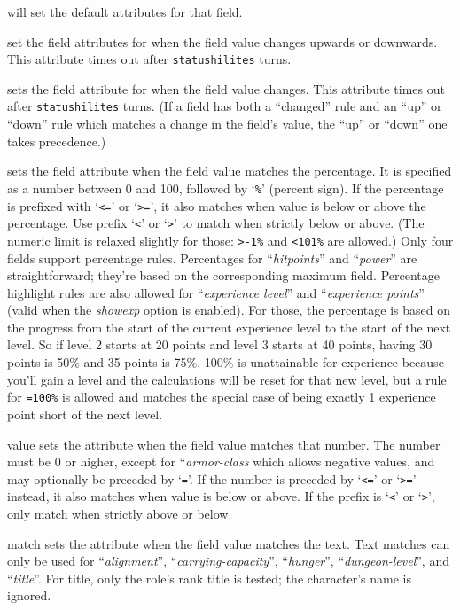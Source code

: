 \blist{}
\item[{\tt always}] will set the default attributes for that field.
\item[{\tt up}{\normalfont, }{\tt down}] set the field attributes
for when the field value changes upwards or downwards. This attribute
times out after {\tt statushilites} turns.
\item[{\tt changed}] sets the field attribute for when the field value
changes. This attribute times out after {\tt statushilites} turns.
(If a field has both a ``changed'' rule and an ``up'' or ``down''
rule which matches a change in the field's value,
the ``up'' or ``down'' one takes precedence.)
\item[{\tt percentage}] sets the field attribute when the field value
matches the percentage.
It is specified as a number between 0 and 100, followed by `{\tt \%}'
(percent sign).
If the percentage is prefixed with `{\tt <=}' or `{\tt >=}',
it also matches when value is below or above the percentage.
Use prefix `{\tt <}' or `{\tt >}' to match when strictly below or above.
(The numeric limit is relaxed slightly for those: {\tt >-1\%}
and {\tt <101\%} are allowed.)
Only four fields support percentage rules.
Percentages for ``{\it hitpoints\/}'' and ``{\it power\/}'' are
straightforward; they're based on the corresponding maximum field.
Percentage highlight rules are also allowed for ``{\it experience level\/}''
and ``{\it experience points\/}'' (valid when the
{\it showexp\/}
option is enabled).
For those, the percentage is based on the progress from the start of
the current experience level to the start of the next level.
So if level 2 starts at 20 points and level 3 starts at 40 points,
having 30 points is 50\% and 35 points is 75\%.
100\% is unattainable for experience because you'll gain a level and
the calculations will be reset for that new level, but a rule for
{\tt =100\%} is allowed and matches the special case of being
exactly 1 experience point short of the next level.
\item[{\tt absolute}] value sets the attribute when the field value
matches that number.
The number must be 0 or higher, except for ``{\it armor-class\/} which
allows negative values, and may optionally be preceded by `{\tt =}'.
If the number is preceded by `{\tt <=}' or `{\tt >=}' instead,
it also matches when value is below or above.
If the prefix is `{\tt <}' or `{\tt >}', only match when strictly
above or below.
\item[{\tt text}] match sets the attribute when the field value matches the text.
Text matches can only be used for ``{\it alignment\/}'',
``{\it carrying-capacity\/}'', ``{\it hunger\/}'', ``{\it dungeon-level\/}'',
and ``{\it title\/}''.
For title, only the role's rank title
is tested; the character's name is ignored.
\elist

